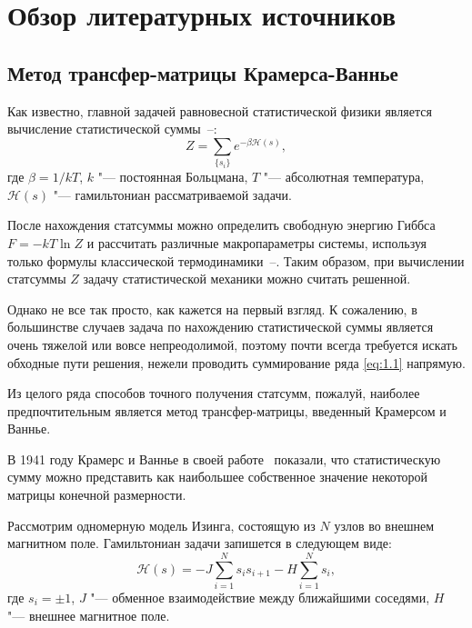 \chapter{Обзор литературных источников}\label{ch:ch1}

\section{Метод трансфер-матрицы Крамерса-Ваннье}\label{sec:ch1/sec1}

Как известно, главной задачей равновесной статистической физики является вычисление статистической суммы~\cite{feynmann1978}--\cite{cubo1967}:
\begin{equation}
Z=\sum_{\{s_{i}\}}e^{-\beta \mathcal{H}(s)}, 
\label{eq:1.1}
\end{equation}
где $\beta = 1/kT$, $k$ "--- постоянная Больцмана, $T$ "--- абсолютная температура, $\mathcal{H}(s)$ "--- гамильтониан рассматриваемой задачи.

После нахождения статсуммы можно определить свободную энергию Гиббса $F=-kT \ln Z$ и рассчитать различные макропараметры системы, используя только формулы классической термодинамики~\cite{feynmann1978}--\cite{cubo1967}. Таким образом, при вычислении статсуммы $Z$ задачу статистической механики можно считать решенной.

Однако не все так просто, как кажется на первый взгляд. К сожалению, в большинстве случаев задача по нахождению статистической суммы является очень тяжелой или вовсе непреодолимой, поэтому почти всегда требуется искать обходные пути решения, нежели проводить суммирование ряда \eqref{eq:1.1} напрямую.

Из целого ряда способов точного получения статсумм, пожалуй, наиболее предпочтительным является метод трансфер-матрицы, введенный Крамерсом и Ваннье. 

В 1941 году Крамерс и Ваннье в своей работе~\cite{kramers_wannier1,kramers_wannier2} показали, что статистическую сумму можно представить как наибольшее собственное значение некоторой матрицы конечной размерности.

Рассмотрим одномерную модель Изинга, состоящую из $N$ узлов во внешнем магнитном поле. Гамильтониан задачи запишется в следующем виде:
\begin{equation}
\mathcal{H}(s) = -J\sum_{i=1}^{N} s_{i}s_{i+1}-H\sum_{i=1}^{N} s_{i},
\label{eq:1.2}
\end{equation}
где $s_{i}=\pm 1$, $J$ "--- обменное взаимодействие между ближайшими соседями,
$H$ "--- внешнее магнитное поле.


